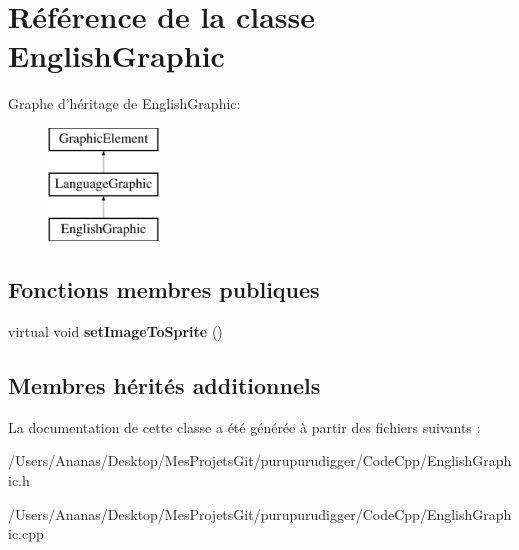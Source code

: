 \hypertarget{class_english_graphic}{\section{Référence de la classe English\-Graphic}
\label{class_english_graphic}
}
Graphe d'héritage de English\-Graphic\-:\begin{figure}[H]
\begin{center}
\leavevmode
\includegraphics[height=3.000000cm]{class_english_graphic}
\end{center}
\end{figure}
\subsection*{Fonctions membres publiques}
\begin{DoxyCompactItemize}
\item 
\hypertarget{class_english_graphic_a8724406bc3e9168b6413683d5458a94a}{virtual void {\bfseries set\-Image\-To\-Sprite} ()}\label{class_english_graphic_a8724406bc3e9168b6413683d5458a94a}

\end{DoxyCompactItemize}
\subsection*{Membres hérités additionnels}


La documentation de cette classe a été générée à partir des fichiers suivants \-:\begin{DoxyCompactItemize}
\item 
/\-Users/\-Ananas/\-Desktop/\-Mes\-Projets\-Git/purupurudigger/\-Code\-Cpp/English\-Graphic.\-h\item 
/\-Users/\-Ananas/\-Desktop/\-Mes\-Projets\-Git/purupurudigger/\-Code\-Cpp/English\-Graphic.\-cpp\end{DoxyCompactItemize}
